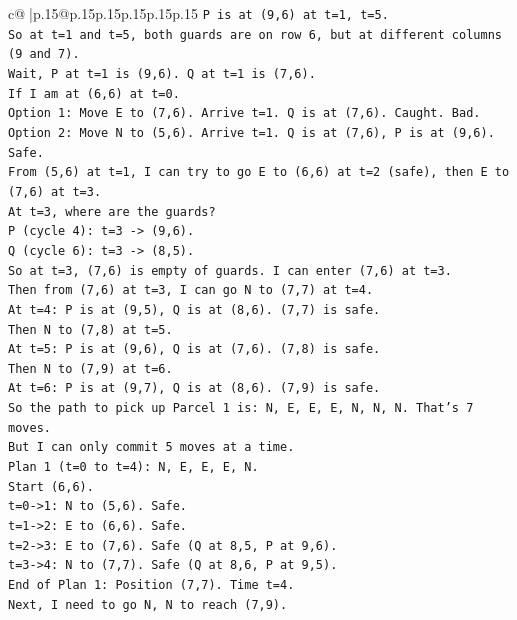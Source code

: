 \documentclass{article}
\begin{document}
{\begin{supertabular}{c@{$\;$}|p{.15\linewidth}@{}p{.15\linewidth}p{.15\linewidth}p{.15\linewidth}p{.15\linewidth}p{.15\linewidth}}
{{{\texttt{P is at (9,6) at t=1, t=5.} \\
\texttt{So at t=1 and t=5, both guards are on row 6, but at different columns (9 and 7).} \\
\texttt{Wait, P at t=1 is (9,6). Q at t=1 is (7,6).} \\
\texttt{If I am at (6,6) at t=0.} \\
\texttt{Option 1: Move E to (7,6). Arrive t=1. Q is at (7,6). Caught. Bad.} \\
\texttt{Option 2: Move N to (5,6). Arrive t=1. Q is at (7,6), P is at (9,6). Safe.} \\
\texttt{From (5,6) at t=1, I can try to go E to (6,6) at t=2 (safe), then E to (7,6) at t=3.} \\
\texttt{At t=3, where are the guards?} \\
\texttt{P (cycle 4): t=3 {-}> (9,6).} \\
\texttt{Q (cycle 6): t=3 {-}> (8,5).} \\
\texttt{So at t=3, (7,6) is empty of guards. I can enter (7,6) at t=3.} \\
\texttt{Then from (7,6) at t=3, I can go N to (7,7) at t=4.} \\
\texttt{At t=4: P is at (9,5), Q is at (8,6). (7,7) is safe.} \\
\texttt{Then N to (7,8) at t=5.} \\
\texttt{At t=5: P is at (9,6), Q is at (7,6). (7,8) is safe.} \\
\texttt{Then N to (7,9) at t=6.} \\
\texttt{At t=6: P is at (9,7), Q is at (8,6). (7,9) is safe.} \\
\texttt{So the path to pick up Parcel 1 is: N, E, E, E, N, N, N. That's 7 moves.} \\
\texttt{But I can only commit 5 moves at a time.} \\
\texttt{Plan 1 (t=0 to t=4): N, E, E, E, N.} \\
\texttt{Start (6,6).} \\
\texttt{t=0{-}>1: N to (5,6). Safe.} \\
\texttt{t=1{-}>2: E to (6,6). Safe.} \\
\texttt{t=2{-}>3: E to (7,6). Safe (Q at 8,5, P at 9,6).} \\
\texttt{t=3{-}>4: N to (7,7). Safe (Q at 8,6, P at 9,5).} \\
\texttt{End of Plan 1: Position (7,7). Time t=4.} \\
\texttt{Next, I need to go N, N to reach (7,9).} \\
}}}
\end{supertabular}}
\end{document}
